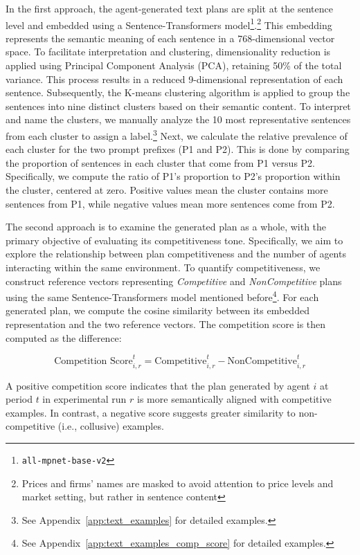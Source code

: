 In the first approach, the agent-generated text plans are split at the sentence level and embedded using a Sentence-Transformers model\footnote{\texttt{all-mpnet-base-v2}}.\footnote{Prices and firms' names are masked to avoid attention to price levels and market setting, but rather in sentence content} This embedding represents the semantic meaning of each sentence in a 768-dimensional vector space. To facilitate interpretation and clustering, dimensionality reduction is applied using Principal Component Analysis (PCA), retaining 50\% of the total variance. This process results in a reduced 9-dimensional representation of each sentence. Subsequently, the K-means clustering algorithm is applied to group the sentences into nine distinct clusters based on their semantic content. To interpret and name the clusters, we manually analyze the 10 most representative sentences from each cluster to assign a label.\footnote{See Appendix~\ref{app:text_examples} for detailed examples.} Next, we calculate the relative prevalence of each cluster for the two prompt prefixes (P1 and P2). This is done by comparing the proportion of sentences in each cluster that come from P1 versus P2. Specifically, we compute the ratio of P1’s proportion to P2’s proportion within the cluster, centered at zero. Positive values mean the cluster contains more sentences from P1, while negative values mean more sentences come from P2.

The second approach is to examine the generated plan as a whole, with the primary objective of evaluating its competitiveness tone. Specifically, we aim to explore the relationship between plan competitiveness and the number of agents interacting within the same environment. To quantify competitiveness, we construct reference vectors representing \textit{Competitive} and \textit{NonCompetitive} plans using the same Sentence-Transformers model mentioned before\footnote{See Appendix~\ref{app:text_examples_comp_score} for detailed examples.}. For each generated plan, we compute the cosine similarity between its embedded representation and the two reference vectors. The competition score is then computed as the difference:

\begin{equation}
    \text{Competition Score}_{i,r}^{t} = \text{Competitive}_{i,r}^{t} - \text{NonCompetitive}_{i,r}^{t}
\end{equation}

A positive competition score indicates that the plan generated by agent $i$ at period $t$ in experimental run $r$ is more semantically aligned with competitive examples. In contrast, a negative score suggests greater similarity to non-competitive (i.e., collusive) examples.

